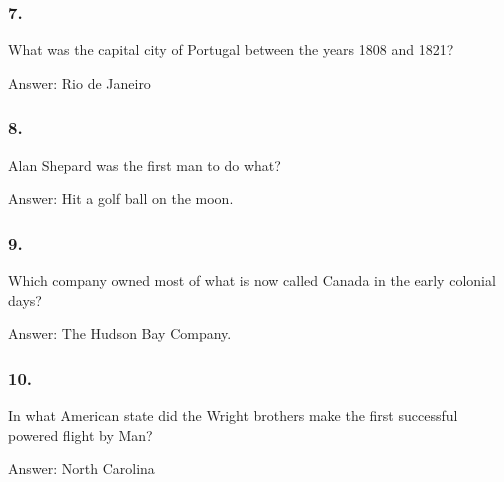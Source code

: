 \documentclass{beamer}
\begin{document}
    \begin{frame}
        \frametitle{7.}
        What was the capital city of Portugal between the years 1808 and
        1821?\\

        \begin{center}
            Answer: Rio de Janeiro
        \end{center}
    \end{frame}

    \begin{frame}
        \frametitle{8.}
        Alan Shepard was the first man to do what?\\

        \begin{center}
            Answer: Hit a golf ball on the moon.
        \end{center}
    \end{frame}

    \begin{frame}
        \frametitle{9.}
        Which company owned most of what is now called Canada in the early
        colonial days?\\

        \begin{center}
            Answer: The Hudson Bay Company.
        \end{center}
    \end{frame}

    \begin{frame}
        \frametitle{10.}
        In what American state did the Wright brothers make the first
        successful powered flight by Man?\\

        \begin{center}
            Answer: North Carolina
        \end{center}
    \end{frame}
\end{document}
